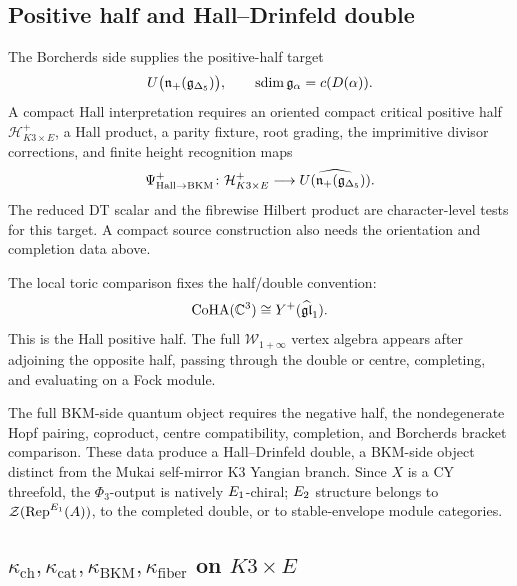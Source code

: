 \subsection*{Positive half and Hall--Drinfeld double}

The Borcherds side supplies the positive-half target
\[
  U\bigl(\mathfrak n_+(\mathfrak g_{\Delta_5})\bigr),
  \qquad
  \operatorname{sdim}\mathfrak g_\alpha=c(D(\alpha)).
\]
A compact Hall interpretation requires an oriented compact critical
positive half \(\mathcal H^+_{K3\times E}\), a Hall product, a parity
fixture, root grading, the imprimitive divisor corrections, and finite
height recognition maps
\[
  \Psi^+_{\mathrm{Hall}\to\mathrm{BKM}}\colon
  \mathcal H^+_{K3\times E}
  \longrightarrow
  \widehat{U(\mathfrak n_+(\mathfrak g_{\Delta_5}))}.
\]
The reduced DT scalar and the fibrewise Hilbert product are
character-level tests for this target.  A compact source construction
also needs the orientation and completion data above.

The local toric comparison fixes the half/double convention:
\[
  \mathrm{CoHA}(\mathbb C^3)\cong Y^+(\widehat{\mathfrak{gl}}_1).
\]
This is the Hall positive half.  The full \(\mathcal W_{1+\infty}\)
vertex algebra appears after adjoining the opposite half, passing through
the double or centre, completing, and evaluating on a Fock module.

The full BKM-side quantum object requires the negative half, the
nondegenerate Hopf pairing, coproduct, centre compatibility, completion,
and Borcherds bracket comparison.  These data produce a
Hall--Drinfeld double, a BKM-side object distinct from the Mukai
self-mirror K3 Yangian branch.  Since \(X\) is a CY threefold, the
\(\Phi_3\)-output is natively \(E_1\)-chiral; \(E_2\) structure
belongs to
\(\mathcal Z(\mathrm{Rep}^{E_1}(A))\), to the completed double, or to stable-envelope
module categories.

\subsection*{\(\kappa_{\mathrm{ch}}, \kappa_{\mathrm{cat}}, \kappa_{\mathrm{BKM}},
\kappa_{\mathrm{fiber}}\) on \(K3\times E\)}

